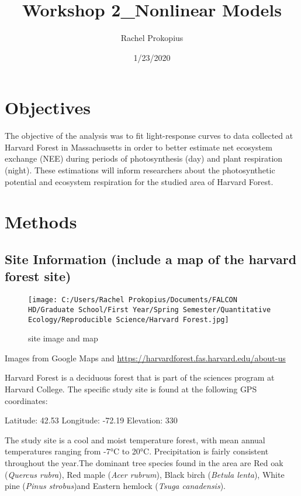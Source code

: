 \documentclass[
]{article}
\title{Workshop 2\_Nonlinear Models}
\author{Rachel Prokopius}
\date{1/23/2020}
\begin{document}
\maketitle

\hypertarget{objectives}{%
\section{Objectives}\label{objectives}}

The objective of the analysis was to fit light-response curves to data
collected at Harvard Forest in Massachusetts in order to better estimate
net ecosystem exchange (NEE) during periods of photosynthesis (day) and
plant respiration (night). These estimations will inform researchers
about the photosynthetic potential and ecosystem respiration for the
studied area of Harvard Forest.

\hypertarget{methods}{%
\section{Methods}\label{methods}}

\hypertarget{site-information-include-a-map-of-the-harvard-forest-site}{%
\subsection{Site Information (include a map of the harvard forest
site)}\label{site-information-include-a-map-of-the-harvard-forest-site}}

\begin{figure}
\centering
\texttt{[image: C:/Users/Rachel Prokopius/Documents/FALCON HD/Graduate School/First Year/Spring Semester/Quantitative Ecology/Reproducible Science/Harvard Forest.jpg]}
\caption{site image and map}
\end{figure}

Images from Google Maps and
\url{https://harvardforest.fas.harvard.edu/about-us}

Harvard Forest is a deciduous forest that is part of the sciences
program at Harvard College. The specific study site is found at the
following GPS coordinates:

Latitude: 42.53 Longitude: -72.19 Elevation: 330

The study site is a cool and moist temperature forest, with mean annual
temperatures ranging from -7°C to 20°C. Precipitation is fairly
consistent throughout the year.The dominant tree species found in the
area are Red oak (\emph{Quercus rubra}), Red maple (\emph{Acer rubrum}),
Black birch (\emph{Betula lenta}), White pine (\emph{Pinus strobus})and
Eastern hemlock (\emph{Tsuga canadensis}).
\end{document}
